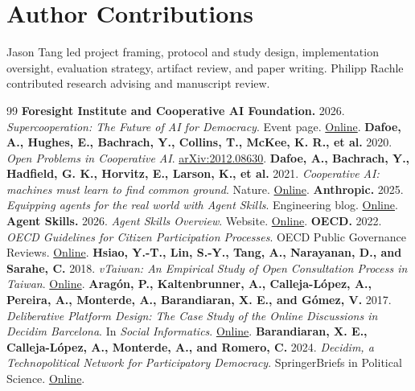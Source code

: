 \documentclass[11pt]{article}
\begin{document}
\section*{Author Contributions}

Jason Tang led project framing, protocol and study design, implementation oversight, evaluation strategy, artifact review, and paper writing. Philipp Rachle contributed research advising and manuscript review.

\begin{thebibliography}{99}
     \textbf{Foresight Institute and Cooperative AI Foundation.} 2026. \textit{Supercooperation: The Future of AI for Democracy}. Event page. \href{https://foresight.org/events/supercooperation-the-future-of-ai-for-democracy/}{Online}.
     \textbf{Dafoe, A., Hughes, E., Bachrach, Y., Collins, T., McKee, K. R., et al.} 2020. \textit{Open Problems in Cooperative AI}. \href{https://doi.org/10.48550/arxiv.2012.08630}{arXiv:2012.08630}.
     \textbf{Dafoe, A., Bachrach, Y., Hadfield, G. K., Horvitz, E., Larson, K., et al.} 2021. \textit{Cooperative AI: machines must learn to find common ground}. Nature. \href{https://doi.org/10.1038/d41586-021-01170-0}{Online}.
     \textbf{Anthropic.} 2025. \textit{Equipping agents for the real world with Agent Skills}. Engineering blog. \href{https://www.anthropic.com/engineering/equipping-agents-for-the-real-world-with-agent-skills}{Online}.
     \textbf{Agent Skills.} 2026. \textit{Agent Skills Overview}. Website. \href{https://agentskills.io/home}{Online}.
     \textbf{OECD.} 2022. \textit{OECD Guidelines for Citizen Participation Processes}. OECD Public Governance Reviews. \href{https://doi.org/10.1787/f765caf6-en}{Online}.
     \textbf{Hsiao, Y.-T., Lin, S.-Y., Tang, A., Narayanan, D., and Sarahe, C.} 2018. \textit{vTaiwan: An Empirical Study of Open Consultation Process in Taiwan}. \href{https://doi.org/10.31235/osf.io/xyhft}{Online}.
     \textbf{Arag\'on, P., Kaltenbrunner, A., Calleja-L\'opez, A., Pereira, A., Monterde, A., Barandiaran, X. E., and G\'omez, V.} 2017. \textit{Deliberative Platform Design: The Case Study of the Online Discussions in Decidim Barcelona}. In \textit{Social Informatics}. \href{https://doi.org/10.1007/978-3-319-67256-4_22}{Online}.
     \textbf{Barandiaran, X. E., Calleja-L\'opez, A., Monterde, A., and Romero, C.} 2024. \textit{Decidim, a Technopolitical Network for Participatory Democracy}. SpringerBriefs in Political Science. \href{https://doi.org/10.1007/978-3-031-50784-7}{Online}.

\end{thebibliography}
\end{document}
